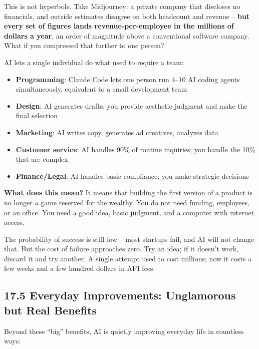\documentclass[11pt,a4paper]{article}
\begin{document}
This is not hyperbole. Take Midjourney: a private company that discloses no financials, and outside estimates disagree on both headcount and revenue -- \textbf{but every set of figures lands revenue-per-employee in the millions of dollars a year}, an order of magnitude above a conventional software company. What if you compressed that further to one person?

AI lets a single individual do what used to require a team:

\begin{itemize}
  \item \textbf{Programming}: Claude Code lets one person run 4--10 AI coding agents simultaneously, equivalent to a small development team
  \item \textbf{Design}: AI generates drafts; you provide aesthetic judgment and make the final selection
  \item \textbf{Marketing}: AI writes copy, generates ad creatives, analyzes data
  \item \textbf{Customer service}: AI handles 90\% of routine inquiries; you handle the 10\% that are complex
  \item \textbf{Finance/Legal}: AI handles basic compliance; you make strategic decisions
\end{itemize}

\textbf{What does this mean?} It means that building the first version of a product is no longer a game reserved for the wealthy. You do not need funding, employees, or an office. You need a good idea, basic judgment, and a computer with internet access.

The probability of success is still low -- most startups fail, and AI will not change that. But the cost of failure approaches zero. Try an idea; if it doesn't work, discard it and try another. A single attempt used to cost millions; now it costs a few weeks and a few hundred dollars in API fees.

\subsection{17.5 Everyday Improvements: Unglamorous but Real Benefits}

Beyond these ``big'' benefits, AI is quietly improving everyday life in countless ways:
\end{document}
